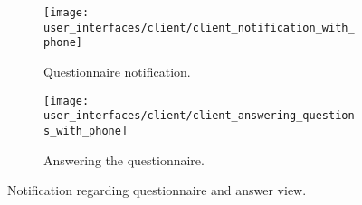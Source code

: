 \begin{figure}[!htbp]
\begin{subfigure}[!t]{.50\textwidth}
  \centering
  \texttt{[image: user\_interfaces/client/client\_notification\_with\_phone]}
  \caption{Questionnaire notification.}
  \label{fig:answering_questionnaire_notification}
\end{subfigure}%
\begin{subfigure}[!t]{.50\textwidth}
  \centering
  \texttt{[image: user\_interfaces/client/client\_answering\_questions\_with\_phone]}
  \caption{Answering the questionnaire.}
  \label{fig:answering_questionnaire_answering}
\end{subfigure}
\caption{Notification regarding questionnaire and answer view.}
\label{fig:answering_questionnaire}
\end{figure}
\FloatBarrier